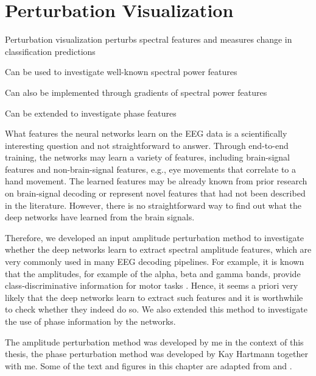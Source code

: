 \chapter{Perturbation Visualization}\label{perturbation-visualization}

\begin{startbox}{Perturbation visualization perturbs spectral features and measures change in classification predictions}
\item Can be used to investigate well-known spectral power features
\item Can also be implemented through gradients of spectral power features
\item Can be extended to investigate phase features
\end{startbox}


What features the neural networks learn on the EEG data is a scientifically interesting question and not straightforward to answer. Through end-to-end training, the networks may learn a variety of features, including brain-signal features and non-brain-signal features, e.g., eye movements that correlate to a hand movement. The learned features may be already known from prior research on brain-signal decoding or represent novel features that had not been described in the literature. However, there is no straightforward way to find out what the deep networks have learned from the brain signals.

    Therefore, we developed an input amplitude perturbation method to
investigate whether the deep networks learn to extract spectral
amplitude features, which are very commonly used in many EEG decoding
pipelines. For example, it is known that the amplitudes, for example of
the alpha, beta and gamma bands, provide class-discriminative
information for motor tasks
\citep{ball_movement_2008,pfurtscheller_evaluation_1979,pfurtscheller_central_1981}.
Hence, it seems a priori very likely that the deep networks learn to
extract such features and it is worthwhile to check whether they indeed do so.
We also extended this method to investigate the use of phase information
by the networks.

The amplitude perturbation method was developed by me in the context of
this thesis, the phase perturbation method was developed by Kay Hartmann
together with me. Some of the text and figures in this chapter are adapted from
\citep{schirrmeisterdeephbm2017} and \citep{hartmann2018hierarchical}.



